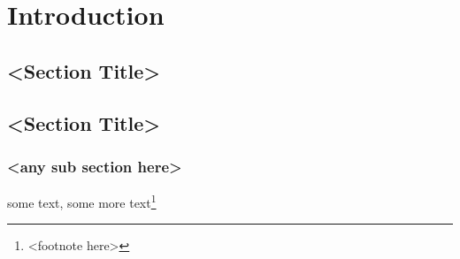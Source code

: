 \chapter{Introduction}

\section{<Section Title>}

\section{<Section Title>}

\subsection{<any sub section here>}
some text\cite{citation-1-name-here}, some more text\footnote{<footnote here>}
